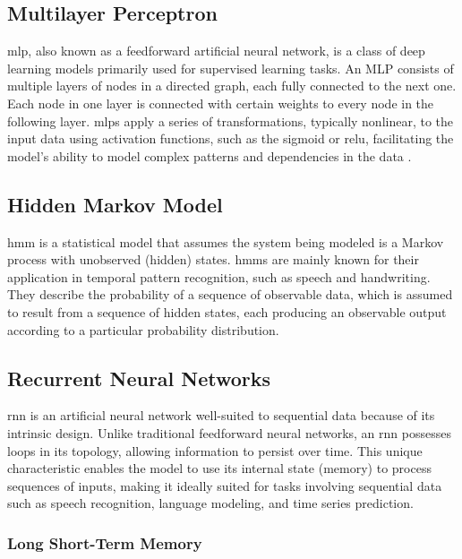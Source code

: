 \subsection{Multilayer Perceptron}

\ac{mlp}, also known as a feedforward artificial neural network, is a class of deep learning models primarily used for supervised learning tasks.
An MLP consists of multiple layers of nodes in a directed graph, each fully connected to the next one.
Each node in one layer is connected with certain weights to every node in the following layer.
\acp{mlp} apply a series of transformations, typically nonlinear, to the input data using activation functions, such as the sigmoid or \ac{relu}, facilitating the model's ability to model complex patterns and dependencies in the data \cite{goodfellow_deep_2016}.

\subsection{Hidden Markov Model}

\ac{hmm} is a statistical model that assumes the system being modeled is a Markov process with unobserved (hidden) states\cite{hmm-rabiner-1989}.
\acp{hmm} are mainly known for their application in temporal pattern recognition, such as speech and handwriting.
They describe the probability of a sequence of observable data, which is assumed to result from a sequence of hidden states, each producing an observable output according to a particular probability distribution.

\subsection{Recurrent Neural Networks}

\ac{rnn} is an artificial neural network well-suited to sequential data because of its intrinsic design.
Unlike traditional feedforward neural networks, an \ac{rnn} possesses loops in its topology, allowing information to persist over time.
This unique characteristic enables the model to use its internal state (memory) to process sequences of inputs, making it ideally suited for tasks involving sequential data such as speech recognition, language modeling, and time series prediction\cite{elman_finding_1990}.

\subsubsection{Long Short-Term Memory}

